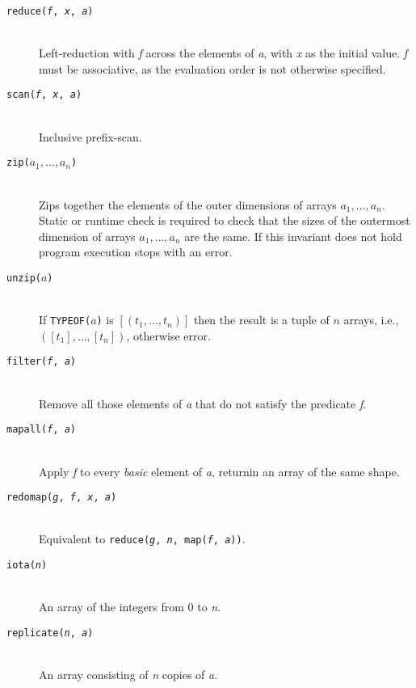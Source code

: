 \documentclass[oneside]{memoir}
\begin{document}
\begin{description}
  \item[\texttt{reduce(\textit{f}, \textit{x}, \textit{a})}]\hfill\\
    Left-reduction with \textit{f} across the elements of \textit{a},
    with \textit{x} as the initial value.  \textit{f} must be
    associative, as the evaluation order is not otherwise specified.

  \item[\texttt{scan(\textit{f}, \textit{x}, \textit{a})}]\hfill\\
    Inclusive prefix-scan.

  \item[\texttt{zip($a_1, \ldots, a_n$)}]\hfill\\
    Zips together the elements of the outer dimensions of arrays $a_1, \ldots, a_n$.
    Static or runtime check is required to check that the sizes of
    the outermost dimension of arrays $a_1, \ldots, a_n$ are the same.
    If this invariant does not hold program execution stops with an error.
  \item[\texttt{unzip($a$)}]\hfill\\
    If \texttt{TYPEOF(}$a$\texttt{)} is $[(t_1, \ldots, t_n)]$ then
    the result is a tuple of $n$ arrays, i.e., $([t_1], \ldots, [t_n])$,
    otherwise error.  
  \item[\texttt{filter(\textit{f}, \textit{a})}]\hfill\\
    Remove all those elements of \textit{a} that do not satisfy the
    predicate \textit{f}.

  \item[\texttt{mapall(\textit{f}, \textit{a})}]\hfill\\
    Apply \textit{f} to every \emph{basic} element of \textit{a},
    returnin an array of the same shape.

  \item[\texttt{redomap(\textit{g}, \textit{f}, \textit{x}, \textit{a})}]\hfill\\
    Equivalent to \texttt{reduce(\textit{g}, \textit{n}, map(\textit{f}, \textit{a}))}.

  \item[\texttt{iota(\textit{n})}]\hfill\\
    An array of the integers from $0$ to \textit{n}.

  \item[\texttt{replicate(\textit{n}, \textit{a})}]\hfill\\
    An array consisting of \textit{n} copies of \textit{a}.


\end{description}
\end{document}
